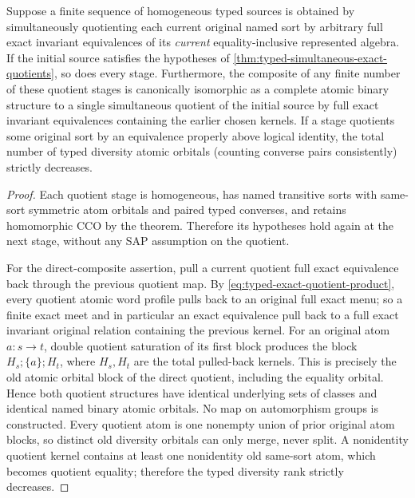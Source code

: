 \begin{corollary}
\label{cor:typed-exact-quotient-towers}
Suppose a finite sequence of homogeneous typed sources is
obtained by simultaneously quotienting each current original
named sort by arbitrary full exact invariant equivalences of
its \emph{current} equality-inclusive represented algebra.
If the initial source satisfies the hypotheses of
\cref{thm:typed-simultaneous-exact-quotients}, so does every
stage.  Furthermore, the composite of any finite number of
these quotient stages is canonically isomorphic as a complete
atomic binary structure to a single simultaneous quotient of
the initial source by full exact invariant equivalences
containing the earlier chosen kernels.  If a stage quotients
some original sort by an equivalence properly above logical
identity, the total number of typed diversity atomic orbitals
(counting converse pairs consistently) strictly decreases.
\end{corollary}
\begin{proof}
Each quotient stage is homogeneous, has named transitive
sorts with same-sort symmetric atom orbitals and paired typed
converses, and retains homomorphic CCO by the theorem.
Therefore its hypotheses hold again at the next stage,
without any SAP assumption on the quotient.

For the direct-composite assertion, pull a current quotient
full exact equivalence back through the previous quotient
map.  By \eqref{eq:typed-exact-quotient-product}, every
quotient atomic word profile pulls back to an original full
exact menu; so a finite exact meet and in particular an
exact equivalence pull back to a full exact invariant
original relation containing the previous kernel.  For an
original atom $a:s\to t$, double quotient saturation of its
first block produces the block
$H_s;\{a\};H_t$, where $H_s,H_t$ are the total pulled-back
kernels.  This is precisely the old atomic orbital block of
the direct quotient, including the equality orbital.
Hence both quotient structures have identical underlying
sets of classes and identical named binary atomic orbitals.
No map on automorphism groups is constructed.  Every quotient
atom is one nonempty union of prior original atom blocks, so
distinct old diversity orbitals can only merge, never split.
A nonidentity quotient kernel contains at least one nonidentity
old same-sort atom, which becomes quotient equality; therefore
the typed diversity rank strictly decreases.
\end{proof}

